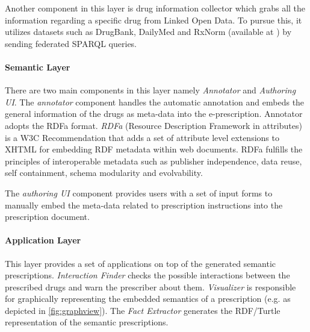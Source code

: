 \documentclass[10pt, conference, compsocconf]{IEEEtran}
\begin{document}
Another component in this layer is drug information collector which grabs all the information regarding a specific drug from Linked Open Data.
To pursue this, it utilizes datasets such as DrugBank, DailyMed and RxNorm (available at \cite{lodd}) by sending federated SPARQL queries.

\paragraph{Semantic Layer}
There are two main components in this layer namely \emph{Annotator} and \emph{Authoring UI}.
The \emph{annotator} component handles the automatic annotation and embeds the general information of the drugs as meta-data into the e-prescription.
Annotator adopts the RDFa format. \emph{RDFa} (Resource Description Framework in attributes) is a W3C Recommendation that adds a set of attribute level extensions to XHTML for embedding RDF metadata within web documents.
RDFa fulfills the principles of interoperable metadata such as publisher independence, data reuse, self containment, schema modularity and evolvability.

The \emph{authoring UI} component provides users with a set of input forms to manually embed the meta-data related to prescription instructions into the prescription document.

\paragraph{Application Layer}
This layer provides a set of applications on top of the generated semantic prescriptions.
\emph{Interaction Finder} checks the possible interactions between the prescribed drugs and warn the prescriber about them.
\emph{Visualizer} is responsible for graphically representing the embedded semantics of a prescription (e.g. as depicted in \autoref{fig:graphview}).
The \emph{Fact Extractor} generates the RDF/Turtle representation of the semantic prescriptions.
\end{document}
